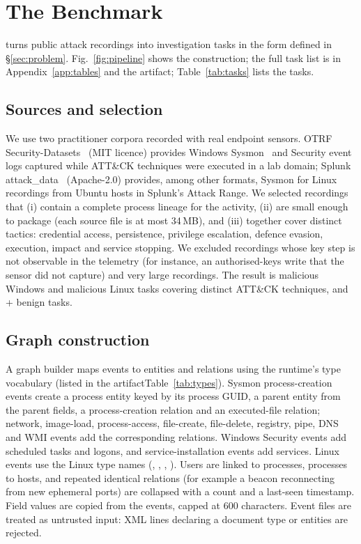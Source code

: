 \section{The \bench Benchmark}
\label{sec:benchmark}

\bench turns public attack recordings into investigation tasks in the form defined in \S\ref{sec:problem}.
Fig.~\ref{fig:pipeline} shows the construction\ifconf; the full task list is in Appendix~\ref{app:tables} and the
artifact\else; Table~\ref{tab:tasks} lists the tasks\fi.



\subsection{Sources and selection}
We use two practitioner corpora recorded with real endpoint sensors. OTRF Security-Datasets~\cite{otrf_securitydatasets}
(MIT licence) provides Windows Sysmon~\cite{microsoft_sysmon} and Security event logs captured while ATT\&CK techniques were executed
in a lab domain; Splunk attack\_data~\cite{splunk_attackdata} (Apache-2.0) provides, among other formats, Sysmon
for Linux~\cite{microsoft_sysmonforlinux} recordings from Ubuntu hosts in Splunk's Attack Range. We selected recordings
that (i) contain a complete process lineage for the activity, (ii) are small enough to package (each source
file is at most 34\,MB), and (iii) together cover distinct tactics: credential access, persistence, privilege
escalation, defence evasion, execution, impact and service stopping. We excluded recordings whose key step is
not observable in the telemetry (for instance, an authorised-keys write that the sensor did not capture) and
very large recordings. The result is \BenchWinMal{} malicious Windows and \BenchLinMal{} malicious Linux tasks
covering \BenchTechniques{} distinct ATT\&CK techniques, and \BenchWinBen{}+\BenchLinBen{} benign tasks.

\subsection{Graph construction}
A graph builder maps events to entities and relations using the runtime's type vocabulary
(\ifconf listed in the artifact\else Table~\ref{tab:types}\fi). Sysmon process-creation events create a process entity keyed by its process GUID, a
parent entity from the parent fields, a process-creation relation and an executed-file relation; network,
image-load, process-access, file-create, file-delete, registry, pipe, DNS and WMI events add the corresponding
relations. Windows Security events add scheduled tasks and logons, and service-installation events add
services. Linux events use the Linux type names (, , ,
). Users are linked to processes, processes to hosts, and repeated identical
relations (for example a beacon reconnecting from new ephemeral ports) are collapsed with a count and a
last-seen timestamp. Field values are copied from the events, capped at 600 characters. Event files are
treated as untrusted input: XML lines declaring a document type or entities are rejected.

